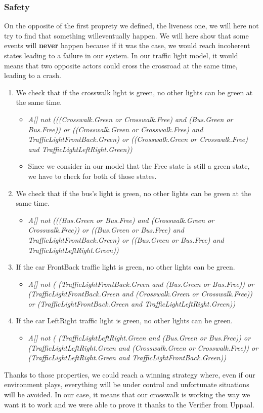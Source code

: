 \subsubsection{Safety} 
On the opposite of the first proprety we defined, the liveness one, we will here not try to find that something willeventually happen. We will here show that some events will \textbf{never} happen because if it was the case, we would reach incoherent states leading to a failure in our system. In our traffic light model, it would means that two opposite actors could cross the crossroad at the same time, leading to a crash. 
\begin{enumerate}
  \item We check that if the crosswalk light is green, no other lights can be green at the same time.
  \begin{itemize}
    \item \textit{A[] not (((Crosswalk.Green or Crosswalk.Free) and  (Bus.Green or Bus.Free)) or ((Crosswalk.Green or Crosswalk.Free) and TrafficLightFrontBack.Green) or ((Crosswalk.Green or Crosswalk.Free) and TrafficLightLeftRight.Green))}
    \item Since we consider in our model that the Free state is still a green state, we have to check for both of those states.
  \end{itemize}
  \item We check that if the bus's light is green, no other lights can be green at the same time.
  \begin{itemize}
    \item \textit{A[] not (((Bus.Green or Bus.Free) and  (Crosswalk.Green or Crosswalk.Free)) or ((Bus.Green or Bus.Free) and TrafficLightFrontBack.Green) or ((Bus.Green or Bus.Free) and TrafficLightLeftRight.Green))}
  \end{itemize}
  \item If the car FrontBack traffic light is green, no other lights can be green.
  \begin{itemize}
    \item \textit{A[] not ( (TrafficLightFrontBack.Green and (Bus.Green or Bus.Free)) or (TrafficLightFrontBack.Green and (Crosswalk.Green or Crosswalk.Free)) or (TrafficLightFrontBack.Green and TrafficLightLeftRight.Green))}
  \end{itemize}
  \item If the car LeftRight traffic light is green, no other lights can be green.
  \begin{itemize}
    \item \textit{A[] not ( (TrafficLightLeftRight.Green and (Bus.Green or Bus.Free)) or (TrafficLightLeftRight.Green and (Crosswalk.Green or Crosswalk.Free)) or (TrafficLightLeftRight.Green and TrafficLightFrontBack.Green))}
  \end{itemize}
\end{enumerate}
Thanks to those properties, we could reach a winning strategy where, even if our environment plays, everything will be under control and unfortunate situations will be avoided. In our case, it means that our crosswalk is working the way we want it to work and we were able to prove it thanks to the Verifier from Uppaal.

